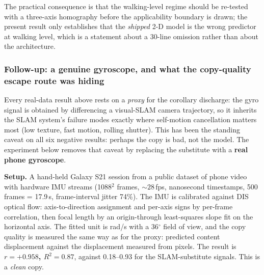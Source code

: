 \documentclass[12pt,a4paper]{article}
\begin{document}
The practical consequence is that the walking-level regime should be re-tested with a three-axis homography before the applicability boundary is drawn; the present result only establishes that the \emph{shipped} 2-D model is the wrong predictor at walking level, which is a statement about a 30-line omission rather than about the architecture.

\subsubsection{Follow-up: a genuine gyroscope, and what the copy-quality escape route was hiding}
\label{sec:realimu}

Every real-data result above rests on a \emph{proxy} for the corollary discharge: the gyro signal is obtained by differencing a visual-SLAM camera trajectory, so it inherits the SLAM system's failure modes exactly where self-motion cancellation matters most (low texture, fast motion, rolling shutter). This has been the standing caveat on all six negative results: perhaps the copy is bad, not the model. The experiment below removes that caveat by replacing the substitute with a \textbf{real phone gyroscope}.

\textbf{Setup.} A hand-held Galaxy S21 session from a public dataset of phone video with hardware IMU streams (1088$^2$ frames, ${\sim}28$\,fps, nanosecond timestamps, 500 frames = 17.9\,s, frame-interval jitter 74\%). The IMU is calibrated against DIS optical flow: axis-to-direction assignment and per-axis signs by per-frame correlation, then focal length by an origin-through least-squares slope fit on the horizontal axis. The fitted unit is rad/s with a 36$^\circ$ field of view, and the copy quality is measured the same way as for the proxy: predicted content displacement against the displacement measured from pixels. The result is \textbf{$r = +0.958$, $R^2 = 0.87$}, against 0.18--0.93 for the SLAM-substitute signals. This is a \emph{clean} copy.
\end{document}
